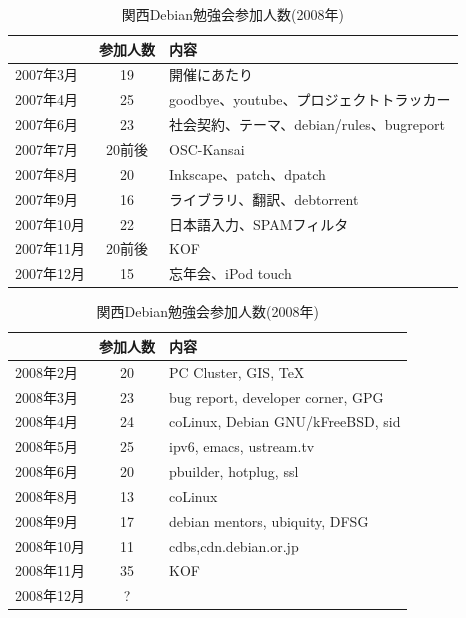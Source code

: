 \documentclass[mingoth,a4paper]{jsarticle}
\begin{document}
\begin{commandline}
\begin{table}
\begin{minipage}{0.5\hsize}
 \caption{関西Debian勉強会参加人数(2007年)}\label{tab:count2007kansai-1}
 \begin{center}
  \begin{tabular}{|l|c|p{10em}|}
 \hline
 & 参加人数 & 内容 \\
 \hline
2007年3月 & 19 & 開催にあたり \\
2007年4月 & 25 & goodbye、youtube、プロジェクトトラッカー\\
2007年6月 & 23 & 社会契約、テーマ、debian/rules、bugreport\\
2007年7月 & 20前後 & OSC-Kansai \\
2007年8月 & 20 & Inkscape、patch、dpatch\\
2007年9月 & 16 & ライブラリ、翻訳、debtorrent\\
2007年10月 & 22& 日本語入力、SPAMフィルタ\\
2007年11月 & 20前後 & KOF \\   
2007年12月 & 15& 忘年会、iPod touch\\   
 \hline
  \end{tabular}
 \end{center}
\end{minipage}
\begin{minipage}{0.5\hsize}
 \caption{関西Debian勉強会参加人数(2008年)}\label{tab:count2008kansai-1}
 \begin{center}
  \begin{tabular}{|l|c|p{10em}|}
 \hline
 & 参加人数 & 内容 \\
 \hline
2008年2月 & 20 & PC Cluster, GIS, \TeX \\
2008年3月 & 23 & bug report, developer corner, GPG \\
2008年4月 & 24 & coLinux, Debian GNU/kFreeBSD, sid \\
2008年5月 & 25  & ipv6, emacs, ustream.tv\\
2008年6月 & 20  & pbuilder, hotplug, ssl\\
2008年8月 & 13  & coLinux \\
2008年9月 & 17  & debian mentors, ubiquity, DFSG\\
2008年10月 & 11  & cdbs,cdn.debian.or.jp \\
2008年11月 & 35  & KOF \\
2008年12月 & ?  & \\
 \hline
  \end{tabular}
 \end{center}
\end{minipage}
\end{table}


\end{commandline}
\end{document}
